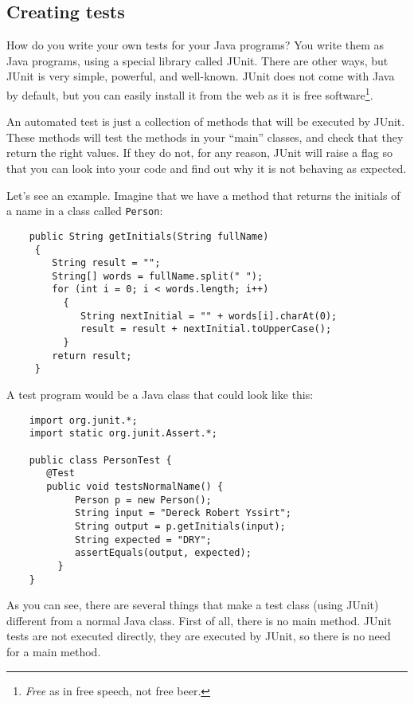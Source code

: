 \subsection{Creating tests}
\label{sec:creating-tests}

How do you write your own tests for your Java programs? You write them
as Java programs, using a special library called JUnit. There are
other ways, but JUnit is very simple, powerful, and well-known. JUnit
does not come with Java by default, but you can easily install it from
the web as it is free software\footnote{\emph{Free} as in free speech,
not free beer.}. 

An automated test is just a collection of methods that will be
executed by JUnit. These methods will test the methods in your
``main'' classes, and check that they return the right values. If they
do not, for any reason, JUnit will raise a flag so that you can look
into your code and find out why it is not behaving as expected. 

Let's see an example. Imagine that we have 
a method that returns the initials of a name
in a class called \verb+Person+: 

\begin{verbatim}
    public String getInitials(String fullName)
     {
        String result = "";
        String[] words = fullName.split(" ");
        for (int i = 0; i < words.length; i++)
          {
             String nextInitial = "" + words[i].charAt(0);
             result = result + nextInitial.toUpperCase();
          }
        return result;
     }
\end{verbatim}

A test program would be a Java class that could look like this: 

\begin{verbatim}
    import org.junit.*;
    import static org.junit.Assert.*;
    
    public class PersonTest {
       @Test
       public void testsNormalName() {
            Person p = new Person();
            String input = "Dereck Robert Yssirt";
            String output = p.getInitials(input);
            String expected = "DRY";
            assertEquals(output, expected);
         }
    }
\end{verbatim}

As you can see, there are several things that make a test class (using
JUnit) different from a normal Java class. First of all, there is no
main method. JUnit tests are not executed directly, they are executed
by JUnit, so there is no need for a main method. 

